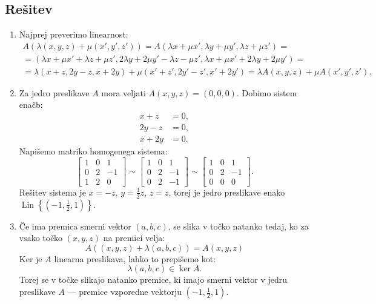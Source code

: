 \documentclass[a4,11pt]{article}
\DeclareMathOperator{\Lin}{Lin}
\begin{document}
\subsection*{Rešitev}
\begin{enumerate}[label=(\alph*)]
    \item Najprej preverimo linearnost: \begin{multline*}
        A\left(\lambda\left(x, y, z\right) + \mu\left(x', y', z'\right)\right) = A\left(\lambda x + \mu x', \lambda y + \mu y', \lambda z + \mu z'\right) = \\
        = \left(\lambda x + \mu x' + \lambda z + \mu z', 2\lambda y + 2\mu y' - \lambda z - \mu z', \lambda x + \mu x' + 2\lambda y + 2\mu y'\right) = \\
        = \lambda\left(x + z, 2y - z, x + 2y\right) + \mu\left(x' + z', 2y' - z', x' + 2y'\right) = \lambda A\left(x, y, z\right) + \mu A\left(x', y', z'\right).
    \end{multline*}
    \item Za jedro preslikave \(A\) mora veljati \(A\left(x, y, z\right) = \left(0, 0, 0\right)\).
        Dobimo sistem enačb:
        \begin{align*}
            x + z & = 0, \\
            2y - z & = 0, \\
            x + 2y & = 0.
        \end{align*}
        Napišemo matriko homogenega sistema:
        \[
            \begin{bmatrix}
                1 & 0 & 1 \\
                0 & 2 & -1 \\
                1 & 2 & 0
            \end{bmatrix}
            \sim
            \begin{bmatrix}
                1 & 0 & 1 \\
                0 & 2 & -1 \\
                0 & 2 & -1
            \end{bmatrix}
            \sim
            \begin{bmatrix}
                1 & 0 & 1 \\
                0 & 2 & -1 \\
                0 & 0 & 0
            \end{bmatrix}.
        \]
        Rešitev sistema je \(x = -z\), \(y = \frac{1}{2}z\), \(z = z\), torej je jedro preslikave enako \(\Lin\left\{(-1, \frac{1}{2}, 1)\right\}\). 
    \item Če ima premica smerni vektor \(\left(a, b, c\right)\), se slika v točko natanko tedaj,
        ko za vsako točko \(\left(x, y, z\right)\) na premici velja:
        \[
            A\left(\left(x, y, z\right) + \lambda\left(a, b, c\right)\right) = A\left(x, y, z\right)
        \]
        Ker je \(A\) linearna preslikava, lahko to prepišemo kot:
        \[
            \lambda \left(a, b, c\right) \in \ker A.
        \]
        Torej se v točke slikajo natanko premice, ki imajo smerni vektor v jedru preslikave \(A\)
        --- premice vzporedne vektorju \((-1, \frac{1}{2}, 1)\).


\end{enumerate}
\end{document}
